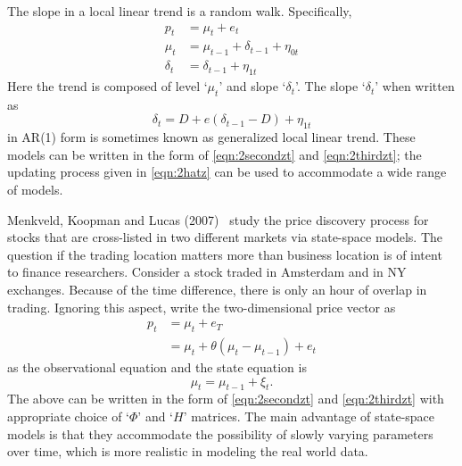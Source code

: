 \begin{ex}
The slope in a local linear trend is a random walk. Specifically,
	\begin{equation} \label{eqn:randomwalk}
	\begin{split}
	p_t&= \mu_t + e_t \\
	\mu_t&= \mu_{t-1} + \delta_{t-1} + \eta_{0t} \\
	\delta_t&= \delta_{t-1} + \eta_{1t}
	\end{split}
	\end{equation}
Here the trend is composed of level `$\mu_t$' and slope `$\delta_t$'. The slope `$\delta_t$' when written as 
	\begin{equation}\label{eqn:slopewritten}
	\delta_t= D+ e(\delta_{t-1} - D)+ \eta_{1t}
	\end{equation}
in AR(1) form is sometimes known as generalized local linear trend. These models can be written in the form of \eqref{eqn:2secondzt} and \eqref{eqn:2thirdzt}; the updating process given in \eqref{eqn:2hatz} can be used to accommodate a wide range of models. \xqed
\end{ex}


\begin{ex}
Menkveld, Koopman and Lucas (2007)~\cite{menkkoop} study the price discovery process for stocks that are cross-listed in two different markets via state-space models. The question if the trading location matters more than business location is of intent to finance researchers. Consider a stock traded in Amsterdam and in NY exchanges. Because of the time difference, there is only an hour of overlap in trading. Ignoring this aspect, write the two-dimensional price vector as
	\begin{equation}
	\begin{split}
	p_t&= \mu_t + e_T \\
	&=\mu_t + \theta(\mu_t - \mu_{t-1}) + e_t
	\end{split}
	\end{equation}
as the observational equation and the state equation is
	\begin{equation}
	\mu_t= \mu_{t-1} + \xi_t.
	\end{equation}
The above can be written in the form of \eqref{eqn:2secondzt} and \eqref{eqn:2thirdzt} with appropriate choice of `$\Phi$' and `$H$' matrices. The main advantage of state-space models is that they accommodate the possibility of slowly varying parameters over time, which is more realistic in modeling the real world data. \xqed
\end{ex}


